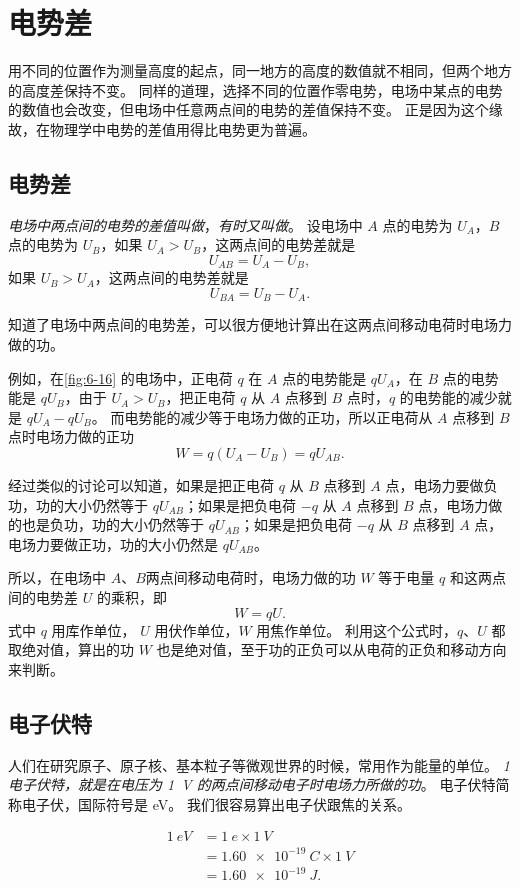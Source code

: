 \section{电势差}
用不同的位置作为测量高度的起点，同一地方的高度的数值就不相同，但两个地方的高度差保持不变。
同样的道理，选择不同的位置作零电势，电场中某点的电势的数值也会改变，但电场中任意两点间的电势的差值保持不变。
正是因为这个缘故，在物理学中电势的差值用得比电势更为普遍。

\subsection{电势差}
\emph{电场中两点间的电势的差值叫做}，\emph{有时又叫做}。
设电场中 $A$ 点的电势为 $U_A$，$B$ 点的电势为 $U_B$，如果 $U_A>U_B$，这两点间的电势差就是
\[U_{AB}=U_A-U_B,\]
如果 $U_B>U_A$，这两点间的电势差就是
\[U_{BA}=U_B-U_A.\]

知道了电场中两点间的电势差，可以很方便地计算出在这两点间移动电荷时电场力做的功。

例如，在\cref{fig:6-16} 的电场中，正电荷 $q$ 在 $A$ 点的电势能是 $qU_A$，在 $B$ 点的电势能是 $qU_B$，由于 $U_A>U_B$，把正电荷 $q$ 从 $A$ 点移到 $B$ 点时，$q$ 的电势能的减少就是 $qU_A-qU_B$。
而电势能的减少等于电场力做的正功，所以正电荷从 $A$ 点移到 $B$ 点时电场力做的正功
\[W=q(U_A-U_B)=qU_{AB}.\]

经过类似的讨论可以知道，如果是把正电荷 $q$ 从 $B$ 点移到 $A$ 点，电场力要做负功，功的大小仍然等于 $qU_{AB}$；如果是把负电荷 $-q$ 从 $A$ 点移到 $B$ 点，电场力做的也是负功，功的大小仍然等于 $qU_{AB}$；如果是把负电荷 $-q$ 从 $B$ 点移到 $A$ 点，电场力要做正功，功的大小仍然是 $qU_{AB}$。

所以，在电场中 $A$、$B $两点间移动电荷时，电场力做的功 $W$ 等于电量 $q$ 和这两点间的电势差 $U$ 的乘积，即
\[W=qU.\]
式中 $q$ 用库作单位， $U$ 用伏作单位，$W$ 用焦作单位。
利用这个公式时，$q$、$U$ 都取绝对值，算出的功 $W$ 也是绝对值，至于功的正负可以从电荷的正负和移动方向来判断。

\subsection{电子伏特}
人们在研究原子、原子核、基本粒子等微观世界的时候，常用作为能量的单位。
\emph{1 电子伏特，就是在电压为 \qty{1}{V} 的两点间移动电子时电场力所做的功}。
电子伏特简称电子伏，国际符号是 \unit{eV}。
我们很容易算出电子伏跟焦的关系。

\[\begin{split}
	\qty{1}{eV}&=\qty{1}{e}\times \qty{1}{V}\\
	&=\qty{1.60e-19}{C}\times \qty{1}{V}\\
  &=\qty{1.60e-19}{J}.	
\end{split}	\]


